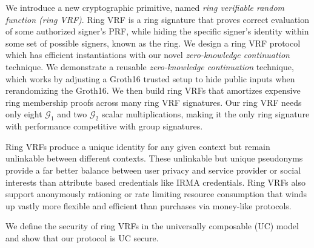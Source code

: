 
\def\eprintsmallskip{\smallskip}{}%
We introduce a new cryptographic primitive,  named
\emph{ring verifiable random function (ring VRF)}.
Ring VRF is a ring signature that proves correct evaluation
of some authorized signer's PRF, while hiding the specific signer's
identity within some set of possible signers, known as the ring. We design a ring VRF protocol which has efficient instantiations with our novel {\em zero-knowledge continuation} technique.
We demonstrate a reusable {\em zero-knowledge continuation} technique,
which works by adjusting a Groth16 trusted setup to hide public inputs
when rerandomizing the Groth16.  We then build ring VRFs that amortizes
expensive ring membership proofs across many ring VRF signatures.
%
Our ring VRF needs only eight $\mathcal{G}_1$ and two
$\mathcal{G}_2$ scalar multiplications, making it the only ring signature
with performance competitive with group signatures.

Ring VRFs produce a unique identity for any given context but remain
unlinkable between different contexts.  These unlinkable but unique
pseudonyms provide a far better balance between user privacy and service
provider or social interests than attribute based credentials like IRMA credentials.
Ring VRFs also support anonymously rationing or rate limiting resource
consumption that winds up vastly more flexible and efficient than
purchases via money-like protocols.

We define the security of ring VRFs in the universally composable (UC) model and show that our protocol is UC secure.